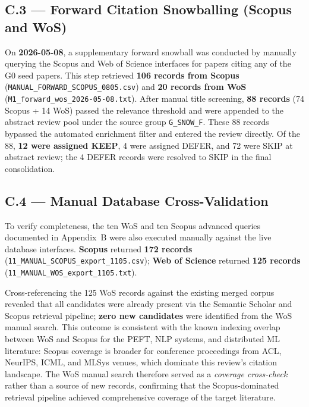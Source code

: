 \subsection*{C.3 — Forward Citation Snowballing (Scopus and WoS)}
\label{app:search_log:forward}

On \textbf{2026-05-08}, a supplementary forward snowball was conducted by manually
querying the Scopus and Web of Science interfaces for papers citing any of the G0 seed
papers. This step retrieved \textbf{106 records from Scopus}
(\texttt{MANUAL\_FORWARD\_SCOPUS\_0805.csv}) and \textbf{20 records from WoS}
(\texttt{M1\_forward\_wos\_2026-05-08.txt}). After manual title screening, \textbf{88
records} (74 Scopus + 14 WoS) passed the relevance threshold and were appended to the
abstract review pool under the source group \texttt{G\_SNOW\_F}. These 88 records
bypassed the automated enrichment filter and entered the review directly. Of the 88,
\textbf{12 were assigned KEEP}, 4 were assigned DEFER, and 72 were SKIP at abstract
review; the 4 DEFER records were resolved to SKIP in the final consolidation.

\subsection*{C.4 — Manual Database Cross-Validation}
\label{app:search_log:crossval}

To verify completeness, the ten WoS and ten Scopus advanced queries documented in
Appendix~B were also executed manually against the live database interfaces.
\textbf{Scopus} returned \textbf{172 records}
(\texttt{11\_MANUAL\_SCOPUS\_export\_1105.csv}); \textbf{Web of Science} returned
\textbf{125 records} (\texttt{11\_MANUAL\_WOS\_export\_1105.txt}).

Cross-referencing the 125 WoS records against the existing merged corpus revealed that
all candidates were already present via the Semantic Scholar and Scopus retrieval
pipeline; \textbf{zero new candidates} were identified from the WoS manual search.
This outcome is consistent with the known indexing overlap between WoS and Scopus for
the PEFT, NLP systems, and distributed ML literature: Scopus coverage is broader for
conference proceedings from ACL, NeurIPS, ICML, and MLSys venues, which dominate this
review's citation landscape. The WoS manual search therefore served as a \textit{coverage
cross-check} rather than a source of new records, confirming that the Scopus-dominated
retrieval pipeline achieved comprehensive coverage of the target literature.

